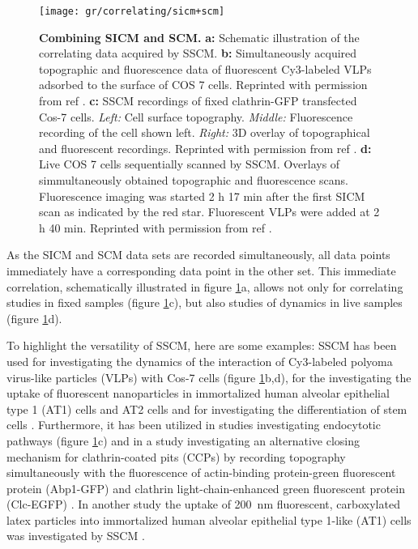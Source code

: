 \begin{figure}
  \texttt{[image: gr/correlating/sicm+scm]}
  \caption{%
    \textbf{Combining SICM and SCM.}
    \textbf{a:} Schematic illustration of the correlating data acquired by SSCM.
    \textbf{b:} Simultaneously acquired topographic and fluorescence data of fluorescent Cy3-labeled 
    VLPs adsorbed to the surface of COS 7 cells. Reprinted with permission from ref \cite{Gorelik2002}.
    \textbf{c:} SSCM recordings of fixed clathrin-GFP transfected Cos-7 cells. 
    	\textit{Left:} Cell surface topography. 
    	\textit{Middle:} Fluorescence recording of the cell shown left. 
    	\textit{Right:} 3D overlay of topographical and fluorescent recordings. 
    Reprinted with permission from ref \cite{Shevchuk2008}.
    \textbf{d:} Live COS 7 cells sequentially scanned by SSCM. Overlays of simmultaneously obtained 
    topographic and fluorescence scans. Fluorescence imaging was started 2 h 17 min after the first 
    SICM scan as indicated by the red star. Fluorescent VLPs were added at 2 h 40 min. 
    Reprinted with permission from ref \cite{Gorelik2002}.
  }
  \label{fig:sicm+scm}
\end{figure}

As the SICM and SCM data sets are recorded simultaneously, all data points immediately have a
corresponding data point in the other set. This immediate correlation, schematically illustrated in
figure \ref{fig:sicm+scm}a, allows not only for correlating studies in fixed samples (figure 
\ref{fig:sicm+scm}c), but also studies of dynamics in live samples (figure \ref{fig:sicm+scm}d).

To highlight the versatility of SSCM, here are some examples: SSCM has been used for investigating the
dynamics of the interaction of Cy3-labeled polyoma virus-like particles (VLPs) with Cos-7 cells 
(figure \ref{fig:sicm+scm}b,d), for the investigating the uptake of fluorescent nanoparticles in 
immortalized human alveolar epithelial type 1 (AT1) cells and AT2 cells \cite{Kemp2008} and for 
investigating the differentiation of stem cells \cite{Gorelik2008}. Furthermore, it has been utilized
in studies investigating endocytotic pathways \cite{Shevchuk2008} (figure \ref{fig:sicm+scm}c) and in
a study investigating an alternative closing mechanism for clathrin-coated pits (CCPs) by recording 
topography simultaneously with the fluorescence of actin-binding protein-green fluorescent protein 
(Abp1-GFP) and clathrin light-chain-enhanced green fluorescent protein (Clc-EGFP) \cite{Shevchuk2012}.
In another study the uptake of 200~nm fluorescent, carboxylated latex particles into immortalized human
alveolar epithelial type 1-like (AT1) cells was investigated by SSCM \cite{Novak2014}. 


